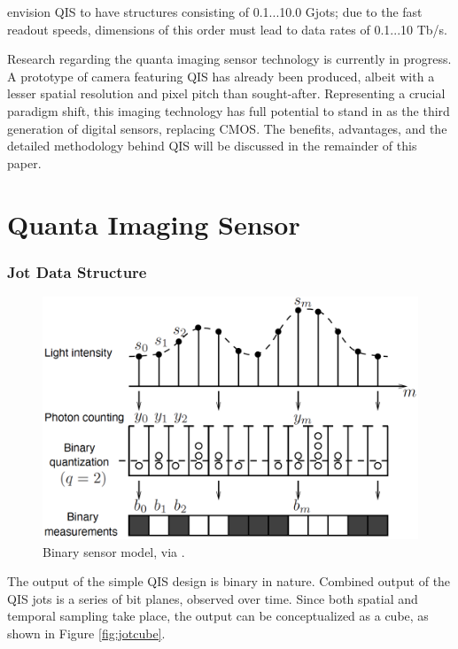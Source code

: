 \cite{MaJotDevices} envision QIS to have structures consisting of 0.1...10.0 Gjots; due to the fast readout speeds, dimensions of this order must lead to data rates of 0.1...10 Tb/s.

Research regarding the quanta imaging sensor technology is currently in progress. A prototype of camera featuring QIS has already been produced, albeit with a lesser spatial resolution and pixel pitch than sought-after. Representing a crucial paradigm shift, this imaging technology has full potential to stand in as the third generation of digital sensors, replacing CMOS. The benefits, advantages, and the detailed methodology behind QIS will be discussed in the remainder of this paper.

\section{Quanta Imaging Sensor}
\subsubsection{Jot Data Structure}

\begin{figure}[h]
  \centering
  \includegraphics[width=\linewidth]{imgs/sensors/binarysensor.png}
  \caption{Binary sensor model, via \cite{Feng_Yang_2012}.}
\end{figure}

The output of the simple QIS design is binary in nature. Combined output of the QIS jots is a series of bit planes, observed over time. Since both spatial and temporal sampling take place, the output can be conceptualized as a cube, as shown in Figure \ref{fig:jotcube}.

